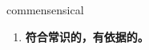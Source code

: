 
\begin{frame}
{\huge commensensical}
\begin{center}
\begin{enumerate}\Large
  \item \textbf{符合常识的，有依据的。}
\end{enumerate}
\end{center}
\end{frame}
